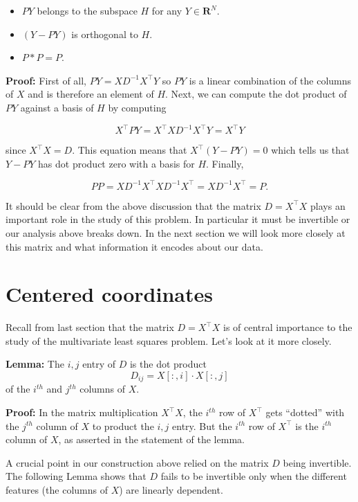 \documentclass[
  11pt,
  letterpaper,
]{scrbook}
\providecommand{\tightlist}{%
  \setlength{\itemsep}{0pt}\setlength{\parskip}{0pt}}\usepackage{longtable,booktabs,array}
\theoremstyle{plain}
\theoremstyle{plain}
\theoremstyle{remark}
\begin{document}
\begin{itemize}
\tightlist
\item
  \(PY\) belongs to the subspace \(H\) for any \(Y\in\mathbf{R}^{N}\).
\item
  \((Y-PY)\) is orthogonal to \(H\).
\item
  \(P*P = P\).
\end{itemize}

\textbf{Proof:} First of all, \(PY=XD^{-1}X^{\intercal}Y\) so \(PY\) is
a linear combination of the columns of \(X\) and is therefore an element
of \(H\). Next, we can compute the dot product of \(PY\) against a basis
of \(H\) by computing

\[ X^{\intercal}PY = X^{\intercal}XD^{-1}X^{\intercal}Y =
X^{\intercal}Y 
\]

since \(X^{\intercal}X=D\). This equation means that
\(X^{\intercal}(Y-PY)=0\) which tells us that \(Y-PY\) has dot product
zero with a basis for \(H\). Finally,

\[ PP = XD^{-1}X^{\intercal}XD^{-1}X^{\intercal} =
XD^{-1}X^{\intercal}=P.  
\]

It should be clear from the above discussion that the matrix
\(D=X^{\intercal}X\) plays an important role in the study of this
problem. In particular it must be invertible or our analysis above
breaks down. In the next section we will look more closely at this
matrix and what information it encodes about our data.

\hypertarget{sec-centered}{%
\section{Centered coordinates}\label{sec-centered}}

Recall from last section that the matrix \(D=X^{\intercal}X\) is of
central importance to the study of the multivariate least squares
problem. Let's look at it more closely.

\textbf{Lemma:} The \(i,j\) entry of \(D\) is the dot product \[
D_{ij}=X[:,i]\cdot X[:,j] \] of the \(i^{th}\) and \(j^{th}\) columns of
\(X\).

\textbf{Proof:} In the matrix multiplication \(X^{\intercal}X\), the
\(i^{th}\) row of \(X^{\intercal}\) gets ``dotted'' with the \(j^{th}\)
column of \(X\) to product the \(i,j\) entry. But the \(i^{th}\) row of
\(X^{\intercal}\) is the \(i^{th}\) column of \(X\), as asserted in the
statement of the lemma.

A crucial point in our construction above relied on the matrix \(D\)
being invertible. The following Lemma shows that \(D\) fails to be
invertible only when the different features (the columns of \(X\)) are
linearly dependent.
\end{document}
